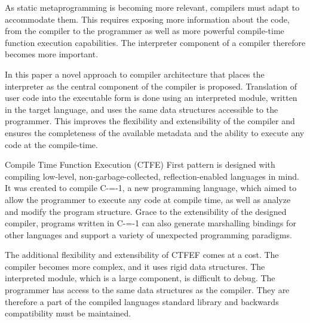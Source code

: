 As static metaprogramming is becoming more relevant, compilers must adapt to accommodate them.
This requires exposing more information about the code, from the compiler to the programmer as well as more powerful compile-time function execution capabilities.
The interpreter component of a compiler therefore becomes more important.


In this paper a novel approach to compiler architecture that places the interpreter as the central component of the compiler is proposed.
Translation of user code into the executable form is done using an interpreted module, written in the target language, and uses the same data structures accessible to the programmer.
This improves the flexibility and extensibility of the compiler and ensures the completeness of the available metadata and the ability to execute any code at the compile-time.


Compile Time Function Execution (CTFE) First pattern is designed with compiling low-level, non-garbage-collected, reflection-enabled languages in mind.
It was created to compile C-=-1, a new programming language, which aimed to allow the programmer to execute any code at compile time, as well as analyze and modify the program structure.
Grace to the extensibility of the designed compiler, programs written in C-=-1 can also generate marshalling bindings for other languages and support a variety of unexpected programming paradigms.


The additional flexibility and extensibility of CTFEF comes at a cost.
The compiler becomes more complex, and it uses rigid data structures.
The interpreted module, which is a large component, is difficult to debug.
The programmer has access to the same data structures as the compiler.
They are therefore a part of the compiled languages standard library and backwards compatibility  must be maintained.
